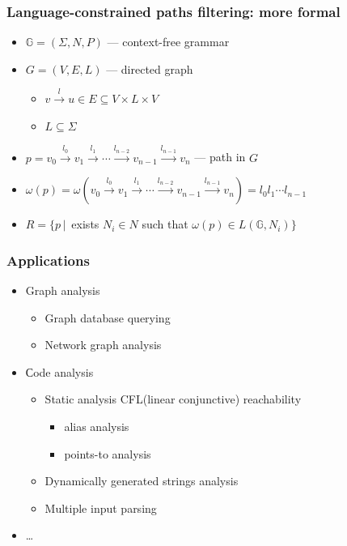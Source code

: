 \documentclass{beamer}
\begin{document}
\begin{frame}[fragile]
  \transwipe[direction=90]
  \frametitle{Language-constrained paths filtering: more formal}
  \begin{itemize}
    \item $\mathbb{G} = (\Sigma, N, P)$ --- context-free grammar
    \item $G = (V,E,L)$ --- directed graph
      \begin{itemize} 
        \item $v \xrightarrow{l} u \in E \subseteq V\times L \times V$
        \item $L\subseteq \Sigma$
      \end{itemize}
    \item $p = v_0 \xrightarrow{l_0} v_1 \xrightarrow{l_1} \cdots \xrightarrow{l_{n-2}} v_{n-1} \xrightarrow{l_{n-1}} v_n$ --- path in $G$
    \item $\omega(p) = \omega(v_0 \xrightarrow{l_0} v_1 \xrightarrow{l_1} \cdots \xrightarrow{l_{n-2}} v_{n-1} \xrightarrow{l_{n-1}} v_n) = l_0 l_1 \cdots l_{n-1}$
    \item $R = \{ p \,|\, $ exists $ N_i \in N $ such that $ \omega(p) \in L(\mathbb{G},N_i)\}$
  \end{itemize}
\end{frame}

\begin{frame}[fragile]
  \transwipe[direction=90]
  \frametitle{Applications}
  \begin{itemize}
    \item Graph analysis
    \begin{itemize}
      \item Graph database querying
      \item Network graph analysis    
    \end{itemize}
    \item Сode analysis
    \begin{itemize}
      \item Static analysis CFL(linear conjunctive) reachability
        \begin{itemize}
          \item alias analysis
          \item points-to analysis
        \end{itemize}
      \item Dynamically generated strings analysis
      \item Multiple input parsing 
    \end{itemize}
    \item \dots
  \end{itemize}
\end{frame}
\end{document}
